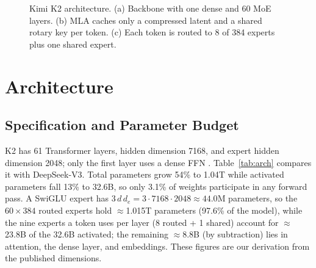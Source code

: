 \documentclass[10pt,twocolumn,letterpaper]{article}
\begin{document}
\begin{figure}[!t]

\caption{Kimi K2 architecture. (a) Backbone with one dense and 60 MoE layers. (b) MLA caches only a compressed latent and a shared rotary key per token. (c) Each token is routed to 8 of 384 experts plus one shared expert.}
\label{fig:arch}
\end{figure}

\section{Architecture}
\subsection{Specification and Parameter Budget}
K2 has 61 Transformer layers, hidden dimension 7168, and expert hidden dimension 2048; only the first layer uses a dense FFN \cite{kimik2}. Table~\ref{tab:arch} compares it with DeepSeek-V3. Total parameters grow 54\% to 1.04T while activated parameters fall 13\% to 32.6B, so only 3.1\% of weights participate in any forward pass. A SwiGLU expert has $3\,d\,d_e = 3\cdot7168\cdot2048\approx 44.0$M parameters, so the $60\times384$ routed experts hold $\approx$1.015T parameters (97.6\% of the model), while the nine experts a token uses per layer (8 routed + 1 shared) account for $\approx$23.8B of the 32.6B activated; the remaining $\approx$8.8B (by subtraction) lies in attention, the dense layer, and embeddings. These figures are our derivation from the published dimensions.
\end{document}
